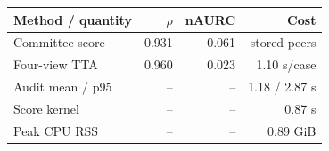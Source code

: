 \begin{tabular}{lrrr}
\toprule
Method / quantity & $\rho$ & nAURC & Cost \\
\midrule
Committee score & 0.931 & 0.061 & stored peers \\
Four-view TTA & 0.960 & 0.023 & 1.10 s/case \\
\midrule
Audit mean / p95 & -- & -- & 1.18 / 2.87 s \\
Score kernel & -- & -- & 0.87 s \\
Peak CPU RSS & -- & -- & 0.89 GiB \\
\bottomrule
\end{tabular}
